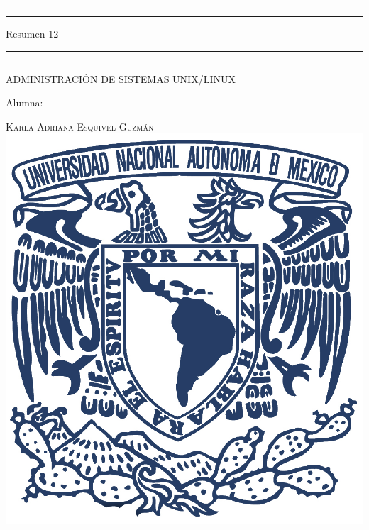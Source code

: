 \documentclass[a4paper, 11pt, oneside]{article}
\begin{document}
 

\begin{titlepage} 

	\centering 
	
	\scshape 
	
	\vspace*{\baselineskip} 
	
	
	
	\rule{\textwidth}{1.6pt}\vspace*{-\baselineskip}\vspace*{2pt} 
	\rule{\textwidth}{0.4pt} 
	
	\vspace{0.75\baselineskip} 
	
	{\LARGE Resumen 12}	
	\vspace{0.75\baselineskip} 
	
	\rule{\textwidth}{0.4pt}\vspace*{-\baselineskip}\vspace{3.2pt}
	\rule{\textwidth}{1.6pt} 
	
	\vspace{2\baselineskip} 
	

	ADMINISTRACIÓN DE SISTEMAS UNIX/LINUX
	
	\vspace*{3\baselineskip} 
	
	
	
	Alumna:
	
	\vspace{0.5\baselineskip} 
	
	{\scshape\Large Karla Adriana Esquivel Guzmán \\} 
	\vspace{0.5\baselineskip} 
	\vfill
	\includegraphics{unam.jpg}
	

\end{titlepage}
\end{document}
